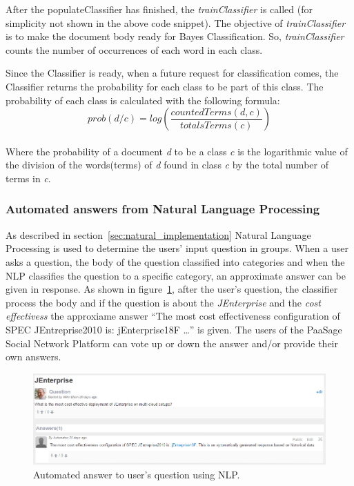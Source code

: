 After the populateClassifier has finished, the \emph{trainClassifier} is called (for simplicity not shown in the above code snippet). The objective of \emph{trainClassifier} is to make the document body ready for Bayes Classification. So, \emph{trainClassifier} counts the number of occurrences of each word in each class.

Since the Classifier is ready, when a future request for classification comes, the Classifier returns the probability for each class to be part of this class. The probability of each class is calculated with the following formula:
\\
\[prob(d / c) = log\left ( \frac{countedTerms(d, c)}{totalsTerms(c)} \right )\]
\\
Where the probability of a document {\it d} to be a class {\it c} is the logarithmic value of the division of the words(terms) of {\it d} found in class {\it c} by the total number of terms in {\it c}.

\subsubsection{Automated answers from Natural Language Processing}
\label{sec:example_nlp}
As described in section~\ref{sec:natural_implementation} Natural Language Processing is used to determine the users' input question in groups. When a user asks a question, the body of the question classified into categories and when the NLP classifies the question to a specific category, an approximate answer can be given in response. As shown in figure~\ref{fig:nlp_example}, after the user's question, the classifier process the body and if the question is about the {\it JEnterprise} and the {\it cost effectivess} the approxiame answer ``The most cost effectiveness configuration of SPEC JEntreprise2010 is: jEnterprise18F \ldots'' is given. The users of the PaaSage Social Network Platform can vote up or down the answer and/or provide their own answers.
\begin{figure}
  \centering
  \includegraphics[scale=0.6]{./fig/nlp_example.png}
  \caption{Automated answer to user's question using NLP.}
  \label{fig:nlp_example}
\end{figure}


